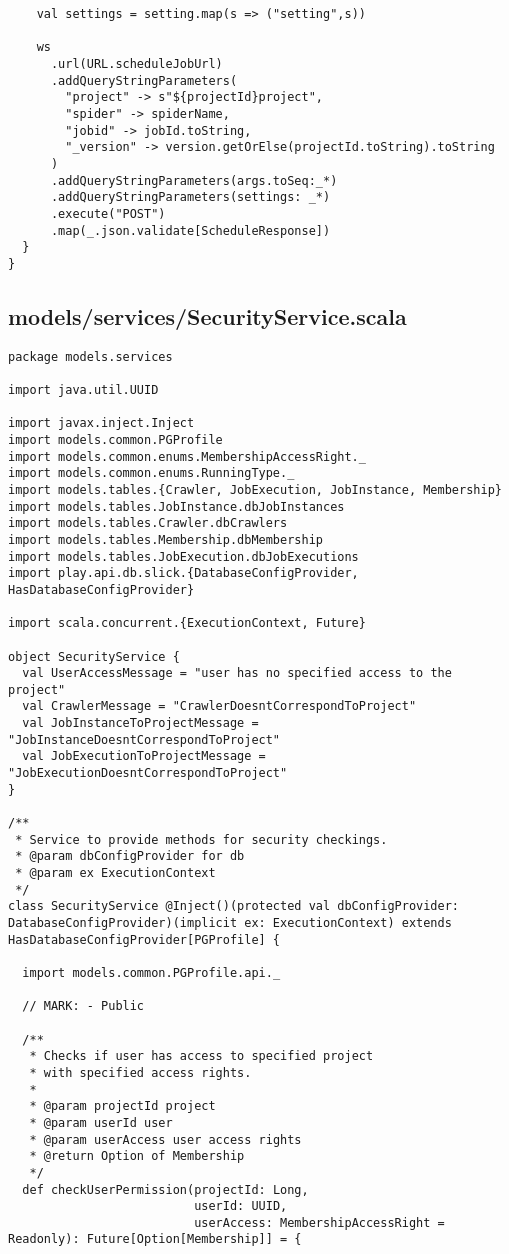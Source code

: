 \begin{lstlisting}
    val settings = setting.map(s => ("setting",s))

    ws
      .url(URL.scheduleJobUrl)
      .addQueryStringParameters(
        "project" -> s"${projectId}project",
        "spider" -> spiderName,
        "jobid" -> jobId.toString,
        "_version" -> version.getOrElse(projectId.toString).toString
      )
      .addQueryStringParameters(args.toSeq:_*)
      .addQueryStringParameters(settings: _*)
      .execute("POST")
      .map(_.json.validate[ScheduleResponse])
  }
}
\end{lstlisting}
\subsection{models/services/SecurityService.scala}
\begin{lstlisting}
package models.services

import java.util.UUID

import javax.inject.Inject
import models.common.PGProfile
import models.common.enums.MembershipAccessRight._
import models.common.enums.RunningType._
import models.tables.{Crawler, JobExecution, JobInstance, Membership}
import models.tables.JobInstance.dbJobInstances
import models.tables.Crawler.dbCrawlers
import models.tables.Membership.dbMembership
import models.tables.JobExecution.dbJobExecutions
import play.api.db.slick.{DatabaseConfigProvider, HasDatabaseConfigProvider}

import scala.concurrent.{ExecutionContext, Future}

object SecurityService {
  val UserAccessMessage = "user has no specified access to the project"
  val CrawlerMessage = "CrawlerDoesntCorrespondToProject"
  val JobInstanceToProjectMessage = "JobInstanceDoesntCorrespondToProject"
  val JobExecutionToProjectMessage = "JobExecutionDoesntCorrespondToProject"
}

/**
 * Service to provide methods for security checkings.
 * @param dbConfigProvider for db
 * @param ex ExecutionContext
 */
class SecurityService @Inject()(protected val dbConfigProvider: DatabaseConfigProvider)(implicit ex: ExecutionContext) extends HasDatabaseConfigProvider[PGProfile] {

  import models.common.PGProfile.api._

  // MARK: - Public

  /**
   * Checks if user has access to specified project
   * with specified access rights.
   *
   * @param projectId project
   * @param userId user
   * @param userAccess user access rights
   * @return Option of Membership
   */
  def checkUserPermission(projectId: Long,
                          userId: UUID,
                          userAccess: MembershipAccessRight = Readonly): Future[Option[Membership]] = {


\end{lstlisting}

